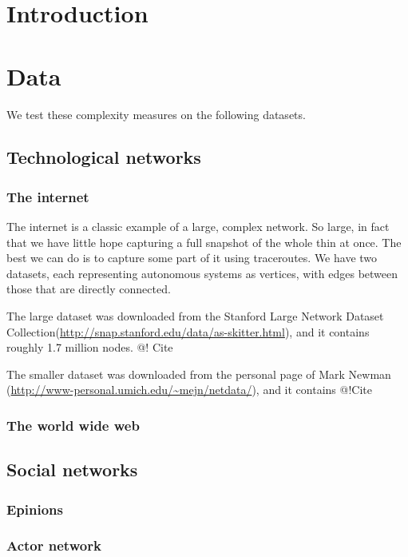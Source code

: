 \documentclass{article}
\theoremstyle{definition}
\begin{document}
\section*{Introduction}

\section*{Data}

We test these complexity measures on the following datasets.

\subsection*{Technological networks}

\subsubsection*{The internet}

The internet is a classic example of a large, complex network. So large, in fact that we have little hope capturing a full snapshot of the whole thin at once. The best we can do is to capture some part of it using traceroutes. We have two datasets, each representing autonomous systems as vertices, with edges between those that are directly connected.

The large dataset was downloaded from the Stanford Large Network Dataset Collection(\url{http://snap.stanford.edu/data/as-skitter.html}), and it contains roughly 1.7 million nodes. @! Cite

The smaller dataset was downloaded from the personal page of Mark Newman (\url{http://www-personal.umich.edu/~mejn/netdata/}), and it contains @!Cite

\subsubsection*{The world wide web}
\subsection*{Social networks}
\subsubsection*{Epinions}
\subsubsection*{Actor network}
\end{document}
